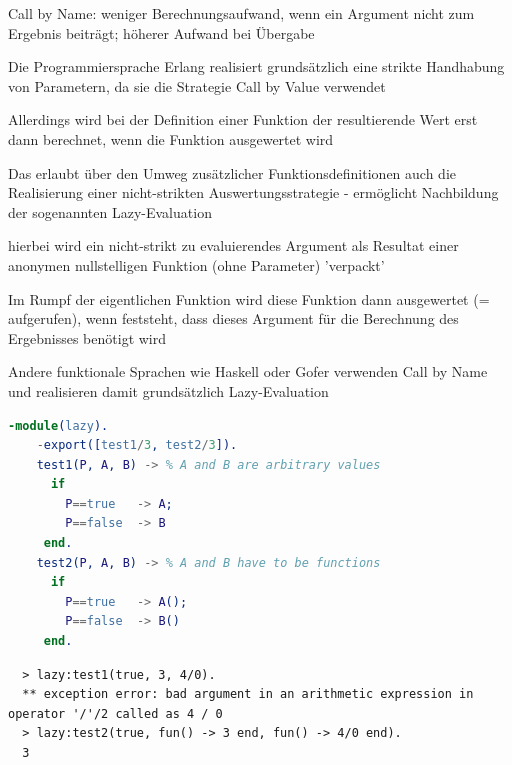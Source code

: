\documentclass[10pt]{article}
\begin{document}
\begin{itemize*}
\begin{itemize*}
      \item Call by Name: weniger Berechnungsaufwand, wenn ein Argument nicht zum Ergebnis beiträgt; höherer Aufwand bei Übergabe
    \end{itemize*}
    \item Die Programmiersprache Erlang realisiert grundsätzlich eine strikte Handhabung von Parametern, da sie die Strategie Call by Value verwendet
    \item Allerdings wird bei der Definition einer Funktion der resultierende Wert erst dann berechnet, wenn die Funktion ausgewertet wird
    \begin{itemize*}
      \item Das erlaubt über den Umweg zusätzlicher Funktionsdefinitionen auch die Realisierung einer nicht-strikten Auswertungsstrategie - ermöglicht Nachbildung der sogenannten Lazy-Evaluation
      \item hierbei wird ein nicht-strikt zu evaluierendes Argument als Resultat einer anonymen nullstelligen Funktion (ohne Parameter) 'verpackt'
      \item Im Rumpf der eigentlichen Funktion wird diese Funktion dann ausgewertet (= aufgerufen), wenn feststeht, dass dieses Argument für die Berechnung des Ergebnisses benötigt wird
      \item Andere funktionale Sprachen wie Haskell oder Gofer verwenden Call by Name und realisieren damit grundsätzlich Lazy-Evaluation
    \end{itemize*}
    
    \begin{lstlisting}[language=erlang]
    -module(lazy).
    -export([test1/3, test2/3]).
    test1(P, A, B) -> % A and B are arbitrary values
      if
        P==true   -> A;
        P==false  -> B
     end.
    test2(P, A, B) -> % A and B have to be functions
      if
        P==true   -> A();
        P==false  -> B()
     end.
  \end{lstlisting}
    
    \begin{lstlisting}
  > lazy:test1(true, 3, 4/0).
  ** exception error: bad argument in an arithmetic expression in operator '/'/2 called as 4 / 0
  > lazy:test2(true, fun() -> 3 end, fun() -> 4/0 end).
  3
  \end{lstlisting}
    

\end{itemize*}
\end{document}
